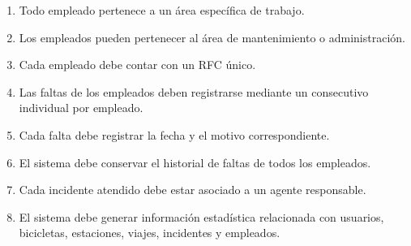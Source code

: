 \begin{enumerate}
	\item Todo empleado pertenece a un área específica de trabajo.
	\item Los empleados pueden pertenecer al área de mantenimiento o administración.
	\item Cada empleado debe contar con un RFC único.
	\item Las faltas de los empleados deben registrarse mediante un consecutivo individual por empleado.
	\item Cada falta debe registrar la fecha y el motivo correspondiente.
	\item El sistema debe conservar el historial de faltas de todos los empleados.
	\item Cada incidente atendido debe estar asociado a un agente responsable.
	\item El sistema debe generar información estadística relacionada con usuarios, bicicletas, estaciones, viajes, incidentes y empleados.
\end{enumerate}
